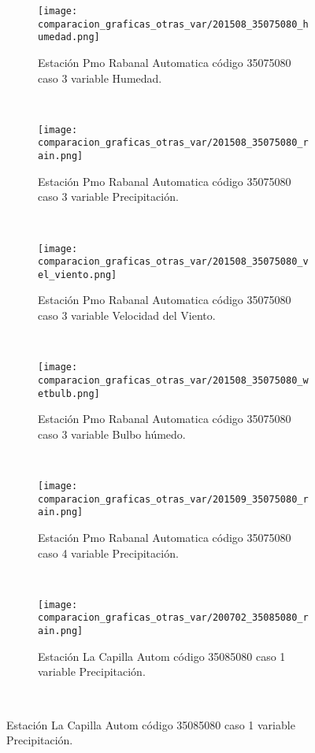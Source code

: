 \begin{figure}[H]
\centering
\begin{subfigure}[normla]{0.4\textwidth}
\caption{Estación Pmo Rabanal Automatica  código 35075080 caso 3 variable Humedad.}
\texttt{[image: comparacion\_graficas\_otras\_var/201508\_35075080\_humedad.png]}
\end{subfigure}
~
\begin{subfigure}[normla]{0.4\textwidth}
\caption{Estación Pmo Rabanal Automatica  código 35075080 caso 3 variable Precipitación.}
\texttt{[image: comparacion\_graficas\_otras\_var/201508\_35075080\_rain.png]}
\end{subfigure}
~
\begin{subfigure}[normla]{0.4\textwidth}
\caption{Estación Pmo Rabanal Automatica  código 35075080 caso 3 variable Velocidad del Viento.}
\texttt{[image: comparacion\_graficas\_otras\_var/201508\_35075080\_vel\_viento.png]}
\end{subfigure}
~
\begin{subfigure}[normla]{0.4\textwidth}
\caption{Estación Pmo Rabanal Automatica  código 35075080 caso 3 variable Bulbo húmedo.}
\texttt{[image: comparacion\_graficas\_otras\_var/201508\_35075080\_wetbulb.png]}
\end{subfigure}
~
\begin{subfigure}[normla]{0.4\textwidth}
\caption{Estación Pmo Rabanal Automatica  código 35075080 caso 4 variable Precipitación.}
\texttt{[image: comparacion\_graficas\_otras\_var/201509\_35075080\_rain.png]}
\end{subfigure}
~
\begin{subfigure}[normla]{0.4\textwidth}
\caption{Estación La Capilla Autom código 35085080 caso 1 variable Precipitación.}
\texttt{[image: comparacion\_graficas\_otras\_var/200702\_35085080\_rain.png]}
\end{subfigure}
~
\end{figure}
           
